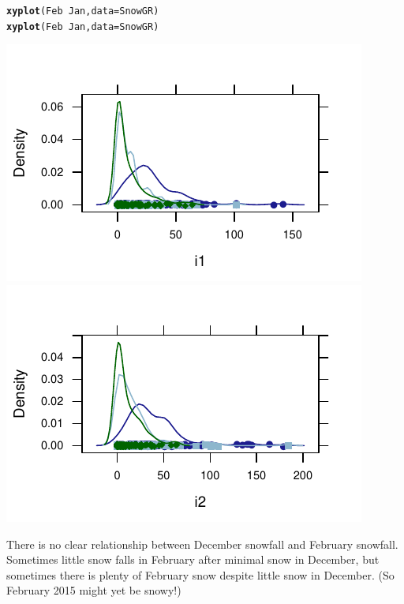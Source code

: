 \documentclass[twoside]{book}\usepackage[]{graphicx}\usepackage[]{xcolor}
\makeatletter
\def\maxwidth{ %
  \ifdim\Gin@nat@width>\linewidth
    \linewidth
  \else
    \Gin@nat@width
  \fi
}
\newcommand{\hlopt}[1]{\textcolor[rgb]{0,0,0}{#1}}%
\newcommand{\hlstd}[1]{\textcolor[rgb]{0.345,0.345,0.345}{#1}}%
\newcommand{\hlkwc}[1]{\textcolor[rgb]{0.333,0.667,0.333}{#1}}%
\newcommand{\hlkwd}[1]{\textcolor[rgb]{0.737,0.353,0.396}{\textbf{#1}}}%
\newenvironment{kframe}{%
 \def\at@end@of@kframe{}%
 \ifinner\ifhmode%
  \def\at@end@of@kframe{\end{minipage}}%
  \begin{minipage}{\columnwidth}%
 \fi\fi%
 \def\FrameCommand##1{\hskip\@totalleftmargin \hskip-\fboxsep
 \colorbox{shadecolor}{##1}\hskip-\fboxsep
     \hskip-\linewidth \hskip-\@totalleftmargin \hskip\columnwidth}%
 \MakeFramed {\advance\hsize-\width
   \@totalleftmargin\z@ \linewidth\hsize
   \@setminipage}}%
 {\par\unskip\endMakeFramed%
 \at@end@of@kframe}
\newenvironment{knitrout}{}{} %
\makeatother
\begin{document}
\begin{solution}
\begin{knitrout}
\color{fgcolor}\begin{kframe}
\begin{alltt}
\hlkwd{xyplot}\hlstd{(Feb} \hlopt{~} \hlstd{Jan,} \hlkwc{data} \hlstd{= SnowGR)}
\hlkwd{xyplot}\hlstd{(Feb} \hlopt{~} \hlstd{Jan,} \hlkwc{data} \hlstd{= SnowGR)}
\end{alltt}
\end{kframe}

{\centering \includegraphics[width=\maxwidth]{figures/fig-unnamed-chunk-36-1} 
\includegraphics[width=\maxwidth]{figures/fig-unnamed-chunk-36-2} 

}



\end{knitrout}
There is no clear relationship between December snowfall and February snowfall.  
Sometimes little snow falls in February after minimal snow in December, but sometimes
there is plenty of February snow despite little snow in December.  (So February 2015 might
yet be snowy!)
\end{solution}
\shipoutProblems
\end{document}

